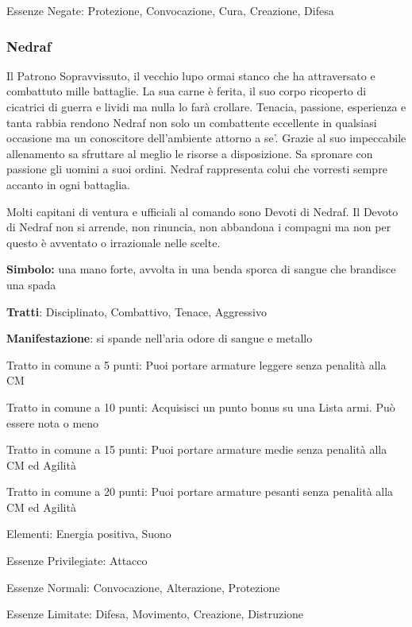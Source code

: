 \documentclass[a4paper,11pt,twoside,openany]{book}
\begin{document}
{Essenze Negate: Protezione, Convocazione, Cura, Creazione, Difesa

\subsubsection{Nedraf}

\label{nedraf}

Il Patrono Sopravvissuto, il vecchio lupo ormai stanco che ha attraversato e combattuto mille battaglie. La sua carne è ferita, il suo corpo ricoperto di cicatrici di guerra e lividi ma nulla lo farà crollare. Tenacia, passione, esperienza e tanta rabbia rendono Nedraf non solo un combattente eccellente in qualsiasi occasione ma un conoscitore dell'ambiente attorno a se'. Grazie al suo impeccabile allenamento sa sfruttare al meglio le risorse a disposizione. Sa spronare con passione gli uomini a suoi ordini.
Nedraf rappresenta colui che vorresti sempre accanto in ogni battaglia. 

Molti capitani di ventura e ufficiali al comando sono Devoti di Nedraf. Il Devoto di Nedraf non si arrende, non rinuncia, non abbandona i compagni ma non per questo è avventato o irrazionale nelle scelte.

\textbf{Simbolo:} una mano forte, avvolta in una benda sporca di sangue
che brandisce una spada

\textbf{Tratti}: Disciplinato, Combattivo, Tenace, Aggressivo

\textbf{Manifestazione}: si spande nell'aria odore di sangue e metallo

\bigskip

Tratto in comune a 5 punti: Puoi portare armature leggere senza penalità alla CM

Tratto in comune a 10 punti: Acquisisci un punto bonus su una Lista armi. Può essere nota o meno

Tratto in comune a 15 punti: Puoi portare armature medie senza penalità alla CM ed Agilità

Tratto in comune a 20 punti: Puoi portare armature pesanti senza penalità alla CM ed Agilità

\bigskip

Elementi: Energia positiva, Suono

\bigskip

Essenze Privilegiate: Attacco

Essenze Normali: Convocazione, Alterazione, Protezione

Essenze Limitate: Difesa, Movimento, Creazione, Distruzione

}
\end{document}
